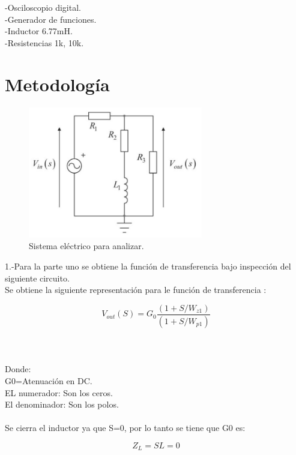 \documentclass[12pt,letterpaper]{article}     %
\begin{document}
-Osciloscopio digital.\\
-Generador de funciones.\\
-Inductor  6.77mH.\\
-Resistencias 1k, 10k.

\section{Metodología}

\begin{figure}[h!]
\centering
\includegraphics[width=3in]{Circuito}
\caption{Sistema eléctrico para analizar.}

\end{figure}

1.-Para la parte uno se obtiene la función de transferencia bajo inspección del siguiente circuito.
\\
Se obtiene la siguiente representación para le función de transferencia :

\begin{equation}\label{eq:ej1}
V_{out}(S) = G_{0}\frac{(1+S/W_{z1})}{(1+S/W_{p1})} 
\end{equation}
\\\\\\
Donde:
\\
G0=Atenuación en DC.\\
EL numerador: Son los ceros.\\
El denominador: Son los polos.\\\\
Se cierra el inductor ya que S=0, por lo tanto se tiene que G0 es:

\begin{equation}\label{eq:ej2}
Z_{L} = SL = 0
\end{equation}
\end{document}
